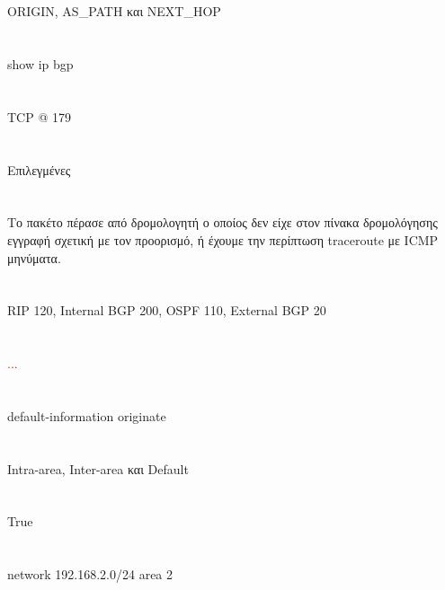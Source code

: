 \documentclass[a4paper, 12pt]{article}
\begin{document}
\section{}
	ORIGIN, AS\_PATH και NEXT\_HOP

\section{}
	show ip bgp

\section{}
	TCP @ 179

\section{}
	Επιλεγμένες

\section{}
	Το πακέτο πέρασε από δρομολογητή ο οποίος δεν είχε στον πίνακα δρομολόγησης εγγραφή σχετική με τον προορισμό, ή έχουμε την περίπτωση traceroute με ICMP μηνύματα.

\section{}
	RIP 120, Internal BGP 200, OSPF 110, External BGP 20

\section{}
	\textcolor{red}{...}

\section{}
	default-information originate

\section{}
	Intra-area, Inter-area και Default

\section{}
	True

\section{}
	network 192.168.2.0/24 area 2
\end{document}

